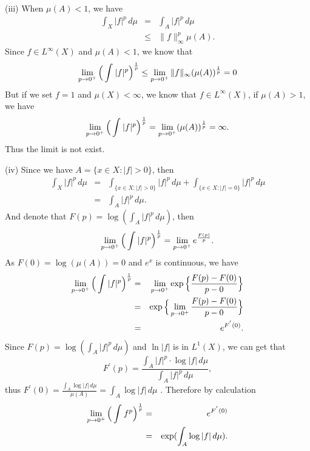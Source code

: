 \documentclass[12pt,a4paper]{ctexart}
\begin{document}
(iii) When $\mu(A)<1$, we have
\begin{eqnarray*}
    \int_{X}^{} |f|^{p} \, d \mu &=& \int_{A}^{} |f|^{p} \, d \mu \\
    & \leq & \|f\|_{\infty}^{p} \mu(A).
\end{eqnarray*}
Since $f \in L^{\infty}(X)$ and $\mu(A) < 1$, we know that
\begin{equation*}
    \lim_{p \to 0^{+}} \Big{(} \int_{}^{} |f|^{p} \Big{)}^{\frac{1}{p}} \leq \lim_{p \to 0^{+}} \|f\|_{\infty} (\mu(A))^{\frac{1}{p}} = 0
\end{equation*}
But if we set $f = 1$ and $\mu(X) < \infty$, we know that $f \in L^{\infty}(X)$, if $\mu(A) > 1$, we have
\begin{equation*}
    \lim_{p \to 0^{+}} \Big{(} \int_{}^{} |f|^{p} \Big{)}^{\frac{1}{p}} = \lim_{p \to 0^{+}} (\mu(A))^{\frac{1}{p}} = \infty.
\end{equation*}
Thus the limit is not exist.

(iv) Since we have $A = \{x \in X: |f| > 0\}$, then
\begin{eqnarray*}
    \int_{X}^{} |f|^{p} \, d \mu & = & \int_{\{x \in X: |f| > 0\}}^{} |f|^{p} \, d \mu + \int_{\{x \in X: |f| = 0\}}^{} |f|^{p} \, d \mu \\
    & = & \int_{A}^{} |f|^{p} \, d \mu.
\end{eqnarray*}
And denote that $F(p) = \log (\int_{A}^{} |f|^{p} \, d \mu)$, then
\begin{equation*}
    \lim_{p \to 0^{+}} \Big{(} \int_{}^{} |f|^{p} \Big{)}^{\frac{1}{p}} = \lim_{p \to 0^{+}} e^{\frac{F(p)}{p}}.
\end{equation*}
As $F(0) = \log(\mu(A)) = 0$ and $e^{x}$ is continuous, we have
\begin{eqnarray*}
    \lim_{p \to 0^{+}} \Big{(} \int_{}^{} |f|^{p} \Big{)}^{\frac{1}{p}} & = & \lim_{p \to 0^{+}} \exp \Big{\{} \frac{F(p) - F(0)}{p - 0} \Big{\}} \\
    & = & \exp \Big{\{} \lim_{p \to 0^{+}} \frac{F(p) - F(0)}{p - 0} \Big{\}} \\
    & = & e^{F^{'}(0)}.
\end{eqnarray*}
Since $F(p) = \log (\int_{A}^{} |f|^{p} \, d \mu)$ and $\ln |f|$ is in $L^{1}(X)$, we can get that
\begin{equation*}
    F^{'}(p) = \frac{\int_{A}^{} |f|^{p} \cdot \log |f| \, d \mu}{\int_{A}^{} |f|^{p} \, d \mu},
\end{equation*}
thus $F^{'}(0) = \frac{\int_{A}^{} \log |f| \, d \mu}{\mu(A)} = \int_{A}^{} \log |f| \, d \mu$ . Therefore by calculation
\begin{eqnarray*}
    \lim_{p \to 0^{+}} \Big{(} \int_{}^{} f^{p} \Big{)}^{\frac{1}{p}} & = & e^{F^{'}(0)} \\
    & = & \exp (\int_{A}^{} \log |f| \, d \mu).
\end{eqnarray*}







 
\end{document}
